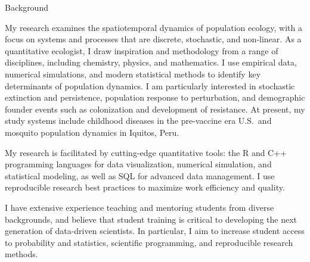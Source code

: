 \documentclass{resume} %
\begin{document}


\begin{rSection}{Background}
\item 
My research examines the spatiotemporal dynamics of population ecology, 
with a focus on systems and processes that are discrete, stochastic,
and non-linear. As a quantitative ecologist, I draw 
inspiration and methodology from a range of disciplines, including 
chemistry, physics, and mathematics.
I use empirical data, numerical simulations, and modern statistical methods to
identify key determinants of population dynamics.  I am particularly interested
in stochastic extinction and persistence, population response to
perturbation, and demographic founder events such
as colonization and development of resistance. At present, my study systems 
include childhood diseases in the pre-vaccine era U.S.\, and mosquito population 
dynamics in Iquitos, Peru.

\item My research is facilitated by cutting-edge quantitative tools:
the R and C++ programming languages for data visualization,
numerical simulation, and statistical modeling, as well as SQL for 
advanced data management. I use reproducible research best practices 
to maximize work efficiency and quality.

\item I have extensive experience teaching and mentoring students from diverse
backgrounds, and believe that student training is critical to developing the
next generation of data-driven scientists.  In particular, I aim to increase
student access to probability and statistics, scientific programming,
and reproducible research methods.

\end{rSection}
\end{document}
